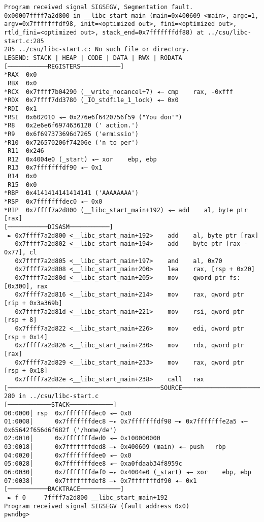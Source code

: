 \documentclass{article}
\begin{document}
\begin{lstlisting}
Program received signal SIGSEGV, Segmentation fault.
0x00007ffff7a2d800 in __libc_start_main (main=0x400609 <main>, argc=1, argv=0x7fffffffdf98, init=<optimized out>, fini=<optimized out>, rtld_fini=<optimized out>, stack_end=0x7fffffffdf88) at ../csu/libc-start.c:285
285	../csu/libc-start.c: No such file or directory.
LEGEND: STACK | HEAP | CODE | DATA | RWX | RODATA
[───────────REGISTERS───────────]
*RAX  0x0
 RBX  0x0
*RCX  0x7ffff7b04290 (__write_nocancel+7) ◂— cmp    rax, -0xfff
*RDX  0x7ffff7dd3780 (_IO_stdfile_1_lock) ◂— 0x0
*RDI  0x1
*RSI  0x602010 ◂— 0x276e6f6420756f59 ("You don'")
*R8   0x2e6e6f6974636120 (' action.')
*R9   0x6f697373696d7265 ('ermissio')
*R10  0x726570206f74206e ('n to per')
 R11  0x246
 R12  0x4004e0 (_start) ◂— xor    ebp, ebp
 R13  0x7fffffffdf90 ◂— 0x1
 R14  0x0
 R15  0x0
*RBP  0x4141414141414141 ('AAAAAAAA')
*RSP  0x7fffffffdec0 ◂— 0x0
*RIP  0x7ffff7a2d800 (__libc_start_main+192) ◂— add    al, byte ptr [rax]
[───────────DISASM───────────]
 ► 0x7ffff7a2d800 <__libc_start_main+192>    add    al, byte ptr [rax]
   0x7ffff7a2d802 <__libc_start_main+194>    add    byte ptr [rax - 0x77], cl
   0x7ffff7a2d805 <__libc_start_main+197>    and    al, 0x70
   0x7ffff7a2d808 <__libc_start_main+200>    lea    rax, [rsp + 0x20]
   0x7ffff7a2d80d <__libc_start_main+205>    mov    qword ptr fs:[0x300], rax
   0x7ffff7a2d816 <__libc_start_main+214>    mov    rax, qword ptr [rip + 0x3a369b]
   0x7ffff7a2d81d <__libc_start_main+221>    mov    rsi, qword ptr [rsp + 8]
   0x7ffff7a2d822 <__libc_start_main+226>    mov    edi, dword ptr [rsp + 0x14]
   0x7ffff7a2d826 <__libc_start_main+230>    mov    rdx, qword ptr [rax]
   0x7ffff7a2d829 <__libc_start_main+233>    mov    rax, qword ptr [rsp + 0x18]
   0x7ffff7a2d82e <__libc_start_main+238>    call   rax
[──────────────────────────────────────────SOURCE───────────────────────────────────────────]
280	in ../csu/libc-start.c
[────────────STACK────────────]
00:0000│ rsp  0x7fffffffdec0 ◂— 0x0
01:0008│      0x7fffffffdec8 —▸ 0x7fffffffdf98 —▸ 0x7fffffffe2a5 ◂— 0x65642f656d6f682f ('/home/de')
02:0010│      0x7fffffffded0 ◂— 0x100000000
03:0018│      0x7fffffffded8 —▸ 0x400609 (main) ◂— push   rbp
04:0020│      0x7fffffffdee0 ◂— 0x0
05:0028│      0x7fffffffdee8 ◂— 0xa0fdaab34f8959c
06:0030│      0x7fffffffdef0 —▸ 0x4004e0 (_start) ◂— xor    ebp, ebp
07:0038│      0x7fffffffdef8 —▸ 0x7fffffffdf90 ◂— 0x1
[───────────BACKTRACE───────────]
 ► f 0     7ffff7a2d800 __libc_start_main+192
Program received signal SIGSEGV (fault address 0x0)
pwndbg> 
\end{lstlisting}
\end{document}
